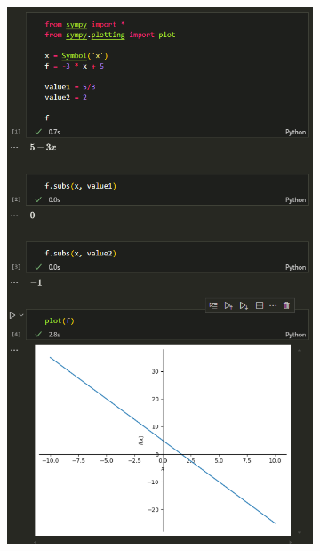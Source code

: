 \documentclass[14pt,a4paper]{extarticle}
\begin{document}
\begin{figure}[!ht]
    \centering
    \begin{subfigure}{.5\textwidth}
        \centering
        \includegraphics[width=0.9\linewidth]{figures/1.1 (1).png}
        \label{fig:1.1(1)}
    \end{subfigure}%
    \begin{subfigure}{.5\textwidth}
        \centering

\end{subfigure}
\end{figure}
\end{document}
